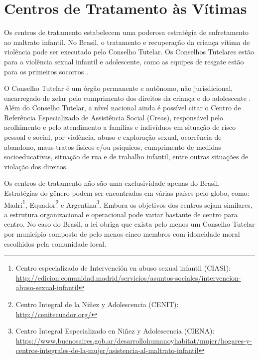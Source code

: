 


\section{Centros de Tratamento às Vítimas}\label{sec:centros}


Os centros de tratamento estabelecem uma poderosa estratégia de enfretamento ao maltrato infantil. No Brasil, o tratamento e recuperação da criança vítima de violência pode ser executado pelo Conselho Tutelar. Os Conselhos Tutelares estão para a violência sexual infantil e adolescente, como as equipes de resgate estão para os primeiros socorros \cite{caccia2014conselheiros}.


O Conselho Tutelar é um órgão permanente e autônomo, não jurisdicional, encarregado de zelar pelo cumprimento dos direitos da criança e do adolescente \cite{saude2002notificacao}. Além do Conselho Tutelar, a nível nacional ainda é possível citar o Centro de Referência Especializado de Assistência Social (Creas), responsável pelo acolhimento e pelo atendimento a famílias e indivíduos em situação de risco pessoal e social, por violência, abuso e exploração sexual, ocorrência de abandono, maus-tratos físicos e/ou psíquicos, cumprimento de medidas socioeducativas, situação de rua e de trabalho infantil, entre outras situações de violação dos direitos.

Os centros de tratamento não são uma exclusividade apenas do Brasil. Estratégias do gênero podem ser encontradas em várias países pelo globo, como: Madri\footnote{ Centro especializado de Intervención en abuso sexual infantil (CIASI): \url{http://edicion.comunidad.madrid/servicios/asuntos-sociales/intervencion-abuso-sexual-infantil}}, Equador\footnote{Centro Integral de la Niñez y Adolescencia (CENIT): \url{http://cenitecuador.org/}} %
e Argentina\footnote{Centro Integral Especializado en Niñez y Adolescencia (CIENA): \url{https://www.buenosaires.gob.ar/desarrollohumanoyhabitat/mujer/hogares-y-centros-integrales-de-la-mujer/asistencia-al-maltrato-infantil}}. Embora os objetivos dos centros sejam similares, a estrutura organizacional e operacional pode variar bastante de centro para centro. No caso do Brasil, a lei obriga que exista pelo menos um Conselho Tutelar por município composto de pelo menos cinco membros com idoneidade moral escolhidos pela comunidade local. %

